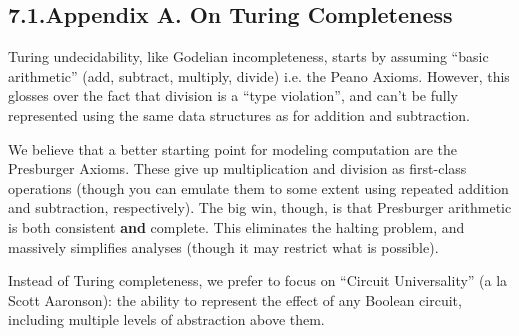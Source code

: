 \documentclass[preprint]{{acmart}}
\begin{document}
\subsection{7.1.\hspace*{0.5em}Appendix A. On Turing Completeness}\label{sec-appendix-a-on-turing-completeness}%

\noindent{}Turing undecidability, like Godelian incompleteness, starts by assuming
\textquotedblleft{}basic arithmetic\textquotedblright{} (add, subtract, multiply, divide) \textendash{} i.e. the Peano
Axioms. However, this glosses over the fact that division is a \textquotedblleft{}type
violation\textquotedblright{}, and can't be fully represented using the same data structures
as for addition and subtraction.%

We believe that a better starting point for modeling computation are the
Presburger Axioms. These give up multiplication and division as
first-class operations (though you can emulate them to some extent using
repeated addition and subtraction, respectively). The big win, though, is
that Presburger arithmetic is both consistent \textbf{and} complete. This
eliminates the halting problem, and massively simplifies analyses (though
it may restrict what is possible).%

Instead of Turing completeness, we prefer to focus on \textquotedblleft{}Circuit
Universality\textquotedblright{} (a la Scott Aaronson): the ability to represent the effect
of any Boolean circuit, including multiple levels of abstraction above
them.%
\end{document}

